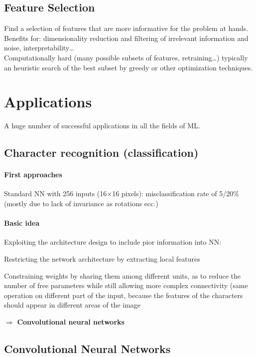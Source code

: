 \documentclass[10pt]{report}
\begin{document}
\subsection{Feature Selection} Find a selection of features that are more informative for the problem at hands. Benefits for: dimensionality reduction and filtering of irrelevant information and noise, interpretability\ldots\\
Computationally hard (many possible subsets of features, retraining\ldots) typically an heuristic search of the best subset by greedy or other optimization techniques.
\section{Applications} A huge number of successful applications in all the fields of ML.
\subsection{Character recognition (classification)}
\paragraph{First approaches} Standard NN with 256 inputs (16$\times$16 pixels): misclassification rate of 5/20\% (mostly due to lack of invariance as rotations ecc.)
\paragraph{Basic idea} Exploiting the architecture design to include pior information into NN:
\begin{list}{}{}
	\item Restricting the network architecture by extracting local features
	\item Constraining weights by sharing them among different units, as to reduce the number of free parameters while still allowing more complex connectivity (same operation on different part of the input, because the features of the characters should appear in different areas of the image
\end{list}
$\Rightarrow$ \textbf{Convolutional neural networks}
\subsection{Convolutional Neural Networks}
\end{document}
